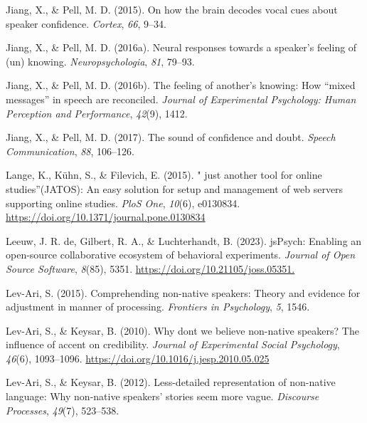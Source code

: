 \documentclass[
  man,floatsintext]{apa6}
\newlength{\cslhangindent}
\newlength{\cslentryspacingunit} %
\newenvironment{CSLReferences}[2] %
 {%
  \setlength{\parindent}{0pt}
  \ifodd #1
  \let\oldpar\par
  \def\par{\hangindent=\cslhangindent\oldpar}
  \fi
  \setlength{\parskip}{#2\cslentryspacingunit}
 }%
 {}
\begin{document}
\begin{CSLReferences}{1}{0}
\leavevmode{}%
Jiang, X., \& Pell, M. D. (2015). On how the brain decodes vocal cues about speaker confidence. \emph{Cortex}, \emph{66}, 9--34.

\leavevmode{}%
Jiang, X., \& Pell, M. D. (2016a). Neural responses towards a speaker's feeling of (un) knowing. \emph{Neuropsychologia}, \emph{81}, 79--93.

\leavevmode{}%
Jiang, X., \& Pell, M. D. (2016b). The feeling of another's knowing: How {``mixed messages''} in speech are reconciled. \emph{Journal of Experimental Psychology: Human Perception and Performance}, \emph{42}(9), 1412.

\leavevmode{}%
Jiang, X., \& Pell, M. D. (2017). The sound of confidence and doubt. \emph{Speech Communication}, \emph{88}, 106--126.

\leavevmode{}%
Lange, K., Kühn, S., \& Filevich, E. (2015). " just another tool for online studies''(JATOS): An easy solution for setup and management of web servers supporting online studies. \emph{PloS One}, \emph{10}(6), e0130834. \url{https://doi.org/10.1371/journal.pone.0130834}

\leavevmode{}%
Leeuw, J. R. de, Gilbert, R. A., \& Luchterhandt, B. (2023). jsPsych: Enabling an open-source collaborative ecosystem of behavioral experiments. \emph{Journal of Open Source Software}, \emph{8}(85), 5351. \url{https://doi.org/10.21105/joss.05351.}

\leavevmode{}%
Lev-Ari, S. (2015). Comprehending non-native speakers: Theory and evidence for adjustment in manner of processing. \emph{Frontiers in Psychology}, \emph{5}, 1546.

\leavevmode{}%
Lev-Ari, S., \& Keysar, B. (2010). Why don{\textquotesingle}t we believe non-native speakers? {The influence of accent on credibility}. \emph{Journal of Experimental Social Psychology}, \emph{46}(6), 1093--1096. \url{https://doi.org/10.1016/j.jesp.2010.05.025}

\leavevmode{}%
Lev-Ari, S., \& Keysar, B. (2012). Less-detailed representation of non-native language: Why non-native speakers' stories seem more vague. \emph{Discourse Processes}, \emph{49}(7), 523--538.


\end{CSLReferences}
\end{document}
